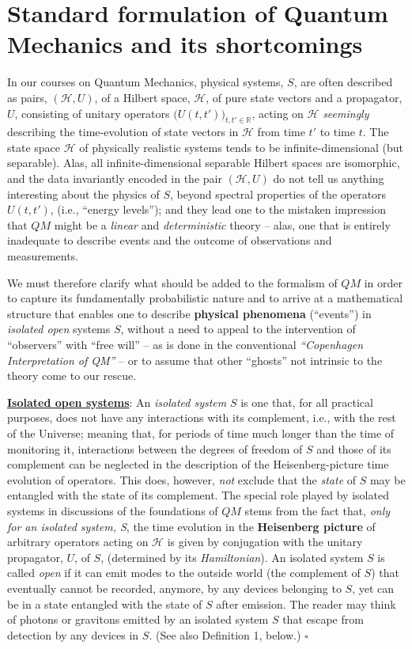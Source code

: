 \documentclass[a4paper,11pt]{article}
\begin{document}
\section{Standard formulation of Quantum Mechanics and its shortcomings}
In our courses on Quantum Mechanics, physical systems, $S$, are often described as pairs, $(\mathcal{H}, U)$, of a Hilbert space, $\mathcal{H}$, of pure state vectors and a propagator, $U$, consisting of unitary operators 
$\big(U(t,t')\big)_{t,t' \in \mathbb{R}}$, acting on $\mathcal{H}$ \textit{seemingly} describing the time-evolution of state vectors in $\mathcal{H}$ from time $t'$ to time $t$. The state space $\mathcal{H}$ of physically realistic systems tends to be infinite-dimensional (but separable). Alas, all infinite-dimensional separable Hilbert spaces are isomorphic, and the data invariantly encoded in the pair $(\mathcal{H}, U)$ do not tell us anything interesting about the physics of $S$, beyond spectral properties of the operators $U(t,t')$, (i.e., ``energy levels''); and they lead one to the mistaken impression that $QM$ might be a \textit{linear} and \textit{deterministic} theory -- alas, one that is entirely inadequate to describe events and the outcome of observations and measurements.

We must therefore clarify what should be added to the formalism of $QM$ in order to capture its fundamentally probabilistic nature and to arrive at a mathematical structure that enables one to describe {\bf{physical phenomena}} (``events'') in  \textit{isolated open} systems $S$, without a need to appeal to the intervention of ``observers'' with ``free will'' -- as is done in the conventional \textit{``Copenhagen Interpretation of QM''} -- or to assume that other ``ghosts'' not intrinsic to the theory come to our rescue.

\underline{\bf{Isolated open systems}}: An \textit{isolated system} $S$ is one that, for all practical purposes, does not have any interactions with its complement, i.e., with the rest of the Universe; meaning that, for periods of time much longer than the time of monitoring it, interactions between the degrees of freedom of $S$ and those of its complement can be neglected in the description of the Heisenberg-picture time evolution of operators. This does, however, \textit{not} exclude that the \textit{state} of $S$ may be entangled with the state of its complement. The special role played by isolated systems in discussions of the foundations of $QM$ stems from the fact that, \textit{only for an isolated system, S}, the time evolution in the {\bf{Heisenberg picture}} of arbitrary operators acting on $\mathcal{H}$ is given by conjugation with the unitary propagator, $U$, of $S$, (determined by its \textit{Hamiltonian}).
An isolated system $S$ is called \textit{open} if it can emit modes to the outside world (the complement of $S$) that eventually cannot be recorded, anymore, by any devices belonging to $S$, yet can be in a state entangled with the state of $S$ after emission. The reader may think of photons or gravitons emitted by an isolated system $S$ that escape from detection by any devices in $S$. (See also Definition 1, below.)\hspace{1cm} $\square$
 
\end{document}
